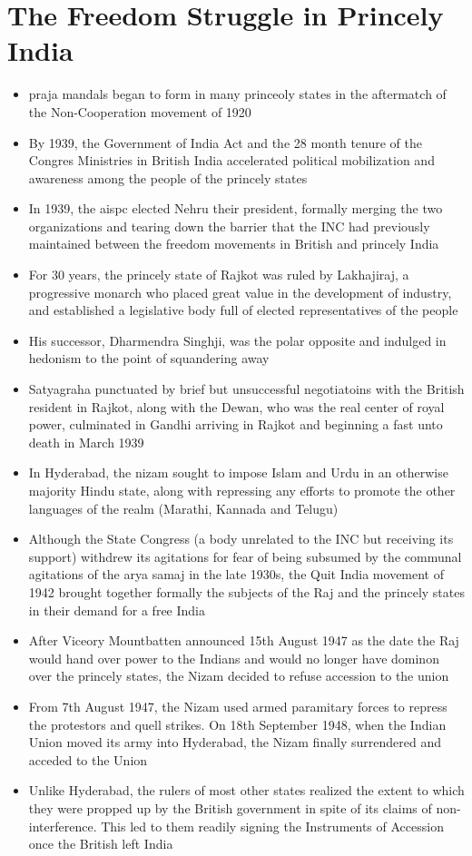 \section{The Freedom Struggle in Princely India}
\begin{itemize}
    \item \Glspl{praja mandal} began to form in many princeoly states in the aftermatch of the Non-Cooperation movement of 1920
    \item By 1939, the Government of India Act and the 28 month tenure of the Congres Ministries in British India accelerated political mobilization and awareness among the people of the princely states
    \item In 1939, the \gls{aispc} elected Nehru their president, formally merging the two organizations and tearing down the barrier that the INC had previously maintained between the freedom movements in British and princely India
    \item For 30 years, the princely state of Rajkot was ruled by Lakhajiraj, a progressive monarch who placed great value in the development of industry, and established a legislative body full of elected representatives of the people
    \item His successor, Dharmendra Singhji, was the polar opposite and indulged in hedonism to the point of squandering away
    \item Satyagraha punctuated by brief but unsuccessful negotiatoins with the British resident in Rajkot, along with the Dewan, who was the real center of royal power, culminated in Gandhi arriving in Rajkot and beginning a fast unto death in March 1939
    \item In Hyderabad, the \Gls{nizam} sought to impose Islam and Urdu in an otherwise majority Hindu state, along with repressing any efforts to promote the other languages of the realm (Marathi, Kannada and Telugu)
    \item Although the State Congress (a body unrelated to the INC but receiving its support) withdrew its agitations for fear of being subsumed by the communal agitations of the \Gls{arya samaj} in the late 1930s, the Quit India movement of 1942 brought together formally the subjects of the Raj and the princely states in their demand for a free India
    \item After Viceory Mountbatten announced 15th August 1947 as the date the Raj would hand over power to the Indians and would no longer have dominon over the princely states, the Nizam decided to refuse accession to the union
    \item From 7th August 1947, the Nizam used armed paramitary forces to repress the protestors and quell strikes. On 18th September 1948, when the Indian Union moved its army into Hyderabad, the Nizam finally surrendered and acceded to the Union
    \item Unlike Hyderabad, the rulers of most other states realized the extent to which they were propped up by the British government in spite of its claims of non-interference. This led to them readily signing the Instruments of Accession once the British left India
\end{itemize}

